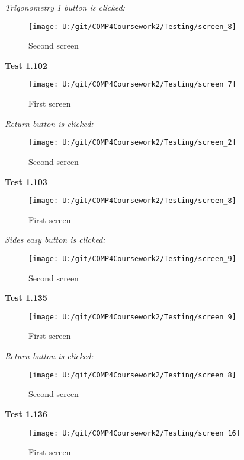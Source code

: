\textit{Trigonometry 1 button is clicked: }

\begin{figure}[H]
    \label{fig: Second Screen}\caption{Second screen}
    \texttt{[image: U:/git/COMP4Coursework2/Testing/screen\_8]}
\end{figure}

\textbf{Test 1.102}

\begin{figure}[H]
    \label{fig: First Screen}\caption{First screen}
    \texttt{[image: U:/git/COMP4Coursework2/Testing/screen\_7]}
\end{figure}

\textit{Return button is clicked: }

\begin{figure}[H]
    \label{fig: Second Screen}\caption{Second screen}
    \texttt{[image: U:/git/COMP4Coursework2/Testing/screen\_2]}
\end{figure}

\textbf{Test 1.103}

\begin{figure}[H]
    \label{fig: First Screen}\caption{First screen}
    \texttt{[image: U:/git/COMP4Coursework2/Testing/screen\_8]}
\end{figure}

\textit{Sides easy button is clicked: }

\begin{figure}[H]
    \label{fig: Second Screen}\caption{Second screen}
    \texttt{[image: U:/git/COMP4Coursework2/Testing/screen\_9]}
\end{figure}

\textbf{Test 1.135}

\begin{figure}[H]
    \label{fig: First Screen}\caption{First screen}
    \texttt{[image: U:/git/COMP4Coursework2/Testing/screen\_9]}
\end{figure}

\textit{Return button is clicked: }

\begin{figure}[H]
    \label{fig: Second Screen}\caption{Second screen}
    \texttt{[image: U:/git/COMP4Coursework2/Testing/screen\_8]}
\end{figure}

\textbf{Test 1.136}

\begin{figure}[H]
    \label{fig: First Screen}\caption{First screen}
    \texttt{[image: U:/git/COMP4Coursework2/Testing/screen\_16]}
\end{figure}

